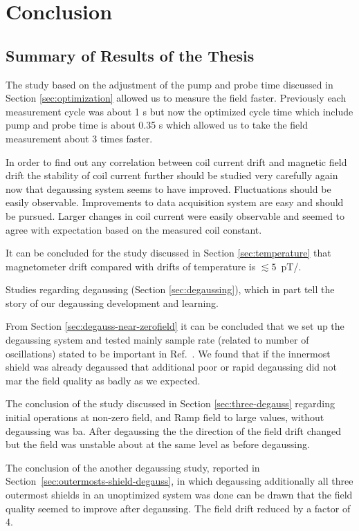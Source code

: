 \chapter{Conclusion\label{ch:conclusion}}
\section{Summary of Results of the Thesis}


The study based on the adjustment of the pump and probe time discussed in Section \ref{sec:optimization} allowed us to measure the field faster. Previously  each measurement cycle was about 1 s but now the optimized cycle time which include pump and probe time is about 0.35 s which allowed us to take the field measurement about 3 times faster.
  

In order to find out any correlation between coil current drift and magnetic field drift the stability of coil current further should be studied very carefully again now
  that degaussing system seems to have improved.  Fluctuations should
  be easily observable.  Improvements to data acquisition system are easy and should be pursued.  Larger changes in coil current were
  easily observable and seemed to agree with expectation based on the
  measured coil constant.
  
  
It can be concluded for the study discussed in Section \ref{sec:temperature}  that  magnetometer drift compared with drifts of temperature is $\lesssim 5$~pT/.

Studies regarding degaussing (Section \ref{sec:degaussing}), which in part tell the story of our
  degaussing development and learning.  
  
From Section \ref{sec:degauss-near-zerofield} it can be concluded that we set up the degaussing system and tested mainly sample rate (related
to number of oscillations) stated to be important in Ref.~\cite{doi:10.1063/1.2713433}.  We found that if the innermost shield
was already degaussed that additional poor or rapid degaussing did not mar
the field quality as badly as we expected.

 The conclusion of the study discussed in Section \ref{sec:three-degauss} regarding initial operations at non-zero field, and Ramp field to large values, without degaussing was ba.  After degaussing  the  the direction of the field drift changed but the field was unstable about  at the same level as before degaussing. 
    
      
The conclusion of the another degaussing study, reported in Section~\ref{sec:outermosts-shield-degauss}, in which degaussing additionally
      all three outermost shields in an unoptimized system was
      done can be drawn that the field quality seemed to improve after degaussing. The field drift reduced by a factor of 4.
 

